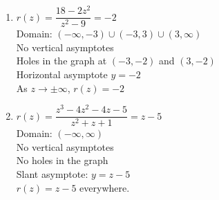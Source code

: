 \begin{multicols}{2}
\begin{enumerate}
\setcounter{enumi}{\value{HW}}

\item $r(z) = \dfrac{18-2z^2}{z^2-9} = -2$\\
Domain: $(-\infty, -3) \cup (-3,3) \cup (3, \infty)$\\
No vertical asymptotes \\
Holes in the graph at $(-3,-2)$ and $(3,-2)$ \\
Horizontal asymptote $y = -2$ \\
As $z \rightarrow \pm \infty$, $r(z) = -2$ \\

\vfill
\columnbreak

\item $r(z) = \dfrac{z^3-4z^2-4z-5}{z^2+z+1} = z-5$\\
Domain: $(-\infty, \infty)$\\
No vertical asymptotes \\
No holes in the graph \\
Slant asymptote:  $y = z-5$ \\
$r(z) = z-5$ everywhere. \\


\setcounter{HW}{\value{enumi}}
\end{enumerate}
\end{multicols}

